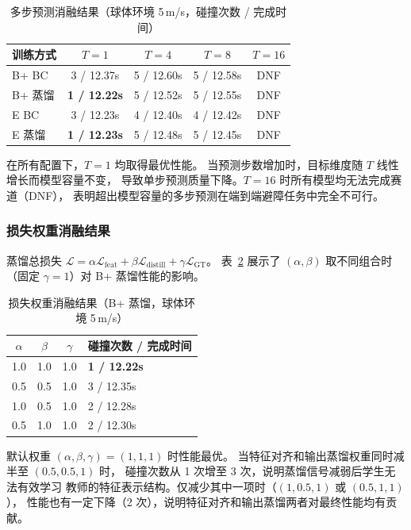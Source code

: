 \documentclass[12pt,a4paper]{article}
\numberwithin{equation}{section}
\numberwithin{figure}{section}
\numberwithin{table}{section}
\begin{document}
\begin{table}[H]
\centering
\caption{多步预测消融结果（球体环境 5\,m/s，碰撞次数 / 完成时间）}
\label{tab:app_multistep}
\begin{tabular}{lcccc}
\toprule
\textbf{训练方式} & $T=1$ & $T=4$ & $T=8$ & $T=16$ \\
\midrule
B+ BC & 3 / 12.37s & 5 / 12.60s & 5 / 12.58s & DNF \\
B+ 蒸馏 & \textbf{1 / 12.22s} & 5 / 12.52s & 5 / 12.55s & DNF \\
E BC & 3 / 12.23s & 4 / 12.40s & 4 / 12.42s & DNF \\
E 蒸馏 & \textbf{1 / 12.23s} & 5 / 12.48s & 5 / 12.45s & DNF \\
\bottomrule
\end{tabular}
\end{table}

\noindent 在所有配置下，$T=1$ 均取得最优性能。
当预测步数增加时，目标维度随 $T$ 线性增长而模型容量不变，
导致单步预测质量下降。$T=16$ 时所有模型均无法完成赛道（DNF），
表明超出模型容量的多步预测在端到端避障任务中完全不可行。

\subsubsection{损失权重消融结果}

蒸馏总损失 $\mathcal{L} = \alpha\mathcal{L}_{\text{feat}} + \beta\mathcal{L}_{\text{distill}} + \gamma\mathcal{L}_{\text{GT}}$。
表~\ref{tab:app_loss} 展示了 $(\alpha, \beta)$ 取不同组合时
（固定 $\gamma=1$）对 B+ 蒸馏性能的影响。

\begin{table}[H]
\centering
\caption{损失权重消融结果（B+ 蒸馏，球体环境 5\,m/s）}
\label{tab:app_loss}
\begin{tabular}{cccl}
\toprule
$\alpha$ & $\beta$ & $\gamma$ & 碰撞次数 / 完成时间 \\
\midrule
1.0 & 1.0 & 1.0 & \textbf{1 / 12.22s} \\
0.5 & 0.5 & 1.0 & 3 / 12.35s \\
1.0 & 0.5 & 1.0 & 2 / 12.28s \\
0.5 & 1.0 & 1.0 & 2 / 12.30s \\
\bottomrule
\end{tabular}
\end{table}

\noindent 默认权重 $(\alpha, \beta, \gamma) = (1, 1, 1)$ 时性能最优。
当特征对齐和输出蒸馏权重同时减半至 $(0.5, 0.5, 1)$ 时，
碰撞次数从 1 次增至 3 次，说明蒸馏信号减弱后学生无法有效学习
教师的特征表示结构。仅减少其中一项时（$(1, 0.5, 1)$ 或 $(0.5, 1, 1)$），
性能也有一定下降（2 次），说明特征对齐和输出蒸馏两者对最终性能均有贡献。
\end{document}
